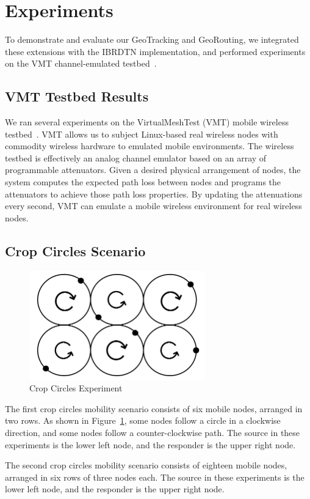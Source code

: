 \section{Experiments}\label{sec:experiments}
To demonstrate and evaluate our GeoTracking and GeoRouting, 
we integrated these extensions with the IBRDTN implementation, and performed experiments on 
the VMT channel-emulated testbed~\cite{hahn10:using, kim11:reality}.  

\subsection{VMT Testbed Results}\label{sec:vmtresults}
We ran several experiments on the VirtualMeshTest (VMT)
mobile wireless testbed~\cite{hahn10:using, kim11:reality}.
VMT allows us to subject Linux-based real wireless nodes with commodity 
wireless hardware to emulated mobile environments.  The 
wireless testbed is effectively an analog channel emulator based
on an array of programmable attenuators.  Given a desired physical arrangement
of nodes, the system computes the expected path loss between
nodes and programs the attenuators to achieve those path loss
properties.  By updating the attenuations every second, VMT can
emulate a mobile wireless environment for real wireless nodes.

\subsection{Crop Circles Scenario}



\begin{figure}
\vspace{-.2cm}
\begin{center}
\includegraphics[width=3in]{figures/cropcircle1.png}
\end{center}
\vspace{-.4cm}
\caption{Crop Circles Experiment}\label{fig:cropcircle1}
\vspace{-.35cm}
\end{figure}

The first crop circles mobility scenario consists of six mobile nodes, arranged in two rows. As shown in 
Figure~\ref{fig:cropcircle1}, some nodes follow a circle in a clockwise direction, and some nodes follow a counter-clockwise path. The source in these experiments is the lower left node, and the responder is the upper right node.



The second crop circles mobility scenario consists of eighteen mobile nodes, arranged in six rows of three nodes each. The source in these experiments is the lower left node, and the responder is the upper right node.
